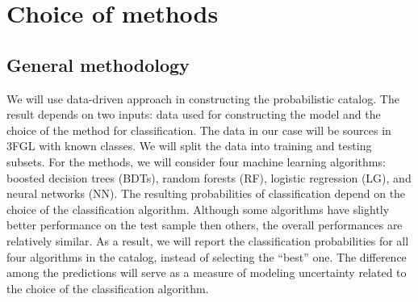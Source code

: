 \section{Choice of methods}

\subsection{General methodology}
We will use data-driven approach in constructing the probabilistic catalog.
The result depends on two inputs: data used for constructing the model and the choice of the method for classification.
The data in our case will be sources in 3FGL with known classes. 
We will split the data into training and testing subsets.
For the methods, we will consider four machine learning algorithms: boosted decision trees (BDTs),  random forests (RF),
logistic regression (LG), and neural networks (NN).
The resulting probabilities of classification depend on the choice of the classification algorithm.
Although some algorithms have slightly better performance on the test sample then others,
the overall performances are relatively similar.
As a result, we will report the classification probabilities for all four algorithms in the catalog, instead of selecting the 
``best'' one.
The difference among the predictions will serve as a measure of modeling uncertainty related to the choice of the classification algorithm.

